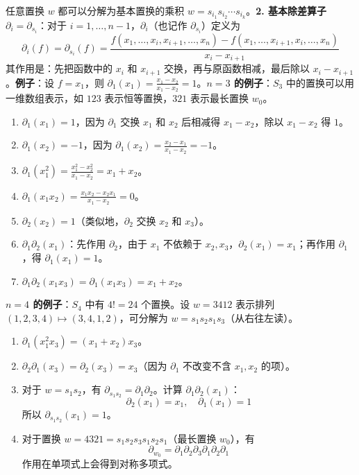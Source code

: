 任意置换 $w$ 都可以分解为基本置换的乘积 $w = s_{i_1} s_{i_2} \cdots s_{i_k}$。\textbf{2. 基本除差算子 $\partial_i = \partial_{s_i}$}：对于 $i = 1, \ldots, n-1$，$\partial_i$（也记作 $\partial_{s_i}$）定义为$$\partial_i(f) = \partial_{s_i}(f) = \frac{f(x_1, \ldots, x_i, x_{i+1}, \ldots, x_n) - f(x_1, \ldots, x_{i+1}, x_i, \ldots, x_n)}{x_i - x_{i+1}}$$其作用是：先把函数中的 $x_i$ 和 $x_{i+1}$ 交换，再与原函数相减，最后除以 $x_i - x_{i+1}$。\textbf{例子}：设 $f = x_1$，则 $\partial_1(x_1) = \frac{x_1 - x_2}{x_1 - x_2} = 1$。\textbf{$n=3$ 的例子}：$S_3$ 中的置换可以用一维数组表示，如 $123$ 表示恒等置换，$321$ 表示最长置换 $w_0$。
\begin{enumerate}
\item $\partial_1(x_1) = 1$，因为
 $\partial_1$ 交换 $x_1$ 和 $x_2$ 后相减得 $x_1 - x_2$，除以 $x_1 - x_2$ 得 $1$。\item $\partial_1(x_2) = -1$，因为 $\partial_1(x_2) = \frac{x_2 - x_1}{x_1 - x_2} = -1$。\item $\partial_1(x_1^2) = \frac{x_1^2 - x_2^2}{x_1 - x_2} = x_1 + x_2$。\item $\partial_1(x_1 x_2) = \frac{x_1 x_2 - x_2 x_1}{x_1 - x_2} = 0$。\item $\partial_2(x_2) = 1$（类似地，$\partial_2$ 交换 $x_2$ 和 $x_3$）。\item $\partial_1 \partial_2 (x_1)$：先作用 $\partial_2$，由于 $x_1$ 不依赖于 $x_2, x_3$，$\partial_2(x_1) = x_1$；再作用 $\partial_1$，得 $\partial_1(x_1) = 1$。\item $\partial_1 \partial_2 (x_1 x_3) = \partial_1(x_1 x_3) = x_1 + x_2$。
\end{enumerate}

\textbf{$n=4$ 的例子}：$S_4$ 中有 $4! = 24$ 个置换。设 $w = 3412$ 表示排列 $(1,2,3,4) \mapsto (3,4,1,2)$，可分解为 $w = s_1 s_2 s_1 s_3$（从右往左读）。
\begin{enumerate}
\item $\partial_1(x_1^2 x_3) = (x_1 + x_2) x_3$。\item $\partial_2 \partial_1 (x_3) = \partial_2(x_3) = x_3$（因为 $\partial_1$ 不改变不含 $x_1, x_2$ 的项）。\item 对于 $w = s_1 s_2$，有 $\partial_{s_1 s_2} = \partial_1 \partial_2$。计算 $\partial_1 \partial_2 (x_1)$：    $$\partial_2(x_1) = x_1, \quad \partial_1(x_1) = 1$$    所以 $\partial_{s_1 s_2}(x_1) = 1$。\item 对于置换 $w = 4321 = s_1 s_2 s_3 s_1 s_2 s_1$（最长置换 $w_0$），有    $$\partial_{w_0} = \partial_1 \partial_2 \partial_3 \partial_1 \partial_2 \partial_1$$    作用在单项式上会得到对称多项式。
\end{enumerate}

